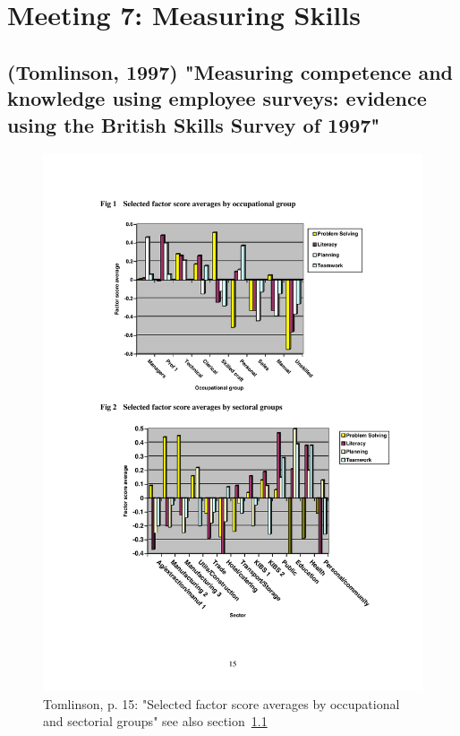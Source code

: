 \documentclass[12pt,a4paper]{article}
\begin{document}
  \section{Meeting 7: Measuring Skills} %
  \label{sec:Meeting 7}
    \subsection{(Tomlinson, 1997) "Measuring competence and knowledge using employee surveys: evidence using the British Skills Survey of 1997"}
    \label{sec:Tomlinson1997}


    \begin{figure}[htb]
      \centering
      \includegraphics[width=\textwidth]{Meeting 7 dp50 - Seite 15.pdf}
      \caption{Tomlinson, p. 15: "Selected factor score averages by occupational and sectorial groups" see also section~\ref{sec:Tomlinson1997}}
      \label{fig:Tomlinson factorscores}
    \end{figure}
\end{document}
